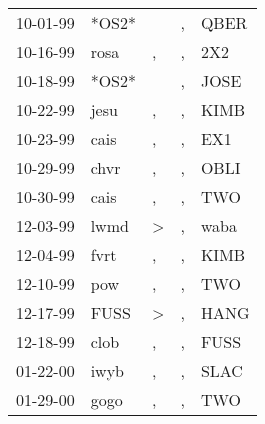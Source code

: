 \begin{supertabular}{p{0.07\textwidth}p{0.06\textwidth}p{0.02\textwidth}p{0.02\textwidth}p{0.06\textwidth}}
          10-01-99\textsuperscript{} &                            *OS2* &                  &                , &           QBER\textsuperscript{} \\
          10-16-99\textsuperscript{} &           rosa\textsuperscript{} &                , &                , &            2X2\textsuperscript{} \\
          10-18-99\textsuperscript{} &                            *OS2* &                  &                , &           JOSE\textsuperscript{} \\
          10-22-99\textsuperscript{} &           jesu\textsuperscript{} &                , &                , &           KIMB\textsuperscript{} \\
          10-23-99\textsuperscript{} &           cais\textsuperscript{} &                , &                , &            EX1\textsuperscript{} \\
          10-29-99\textsuperscript{} &           chvr\textsuperscript{} &                , &                , &           OBLI\textsuperscript{} \\
          10-30-99\textsuperscript{} &           cais\textsuperscript{} &                , &                , &            TWO\textsuperscript{} \\
          12-03-99\textsuperscript{} &           lwmd\textsuperscript{} &     \textgreater &                , &           waba\textsuperscript{} \\
          12-04-99\textsuperscript{} &           fvrt\textsuperscript{} &                , &                , &           KIMB\textsuperscript{} \\
          12-10-99\textsuperscript{} &            pow\textsuperscript{} &                , &                , &            TWO\textsuperscript{} \\
          12-17-99\textsuperscript{} &           FUSS\textsuperscript{} &     \textgreater &                , &           HANG\textsuperscript{} \\
          12-18-99\textsuperscript{} &           clob\textsuperscript{} &                , &                , &           FUSS\textsuperscript{} \\
          01-22-00\textsuperscript{} &           iwyb\textsuperscript{} &                , &                , &           SLAC\textsuperscript{} \\
          01-29-00\textsuperscript{} &           gogo\textsuperscript{} &                , &                , &            TWO\textsuperscript{} \\

\end{supertabular}
